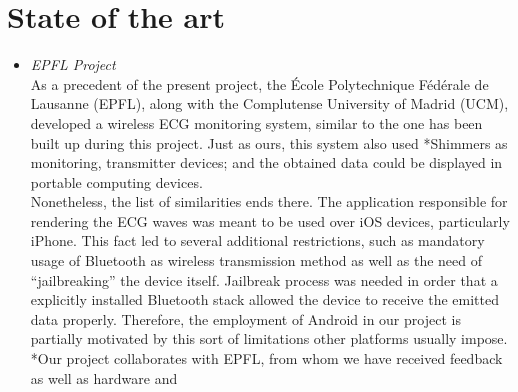 	\section{State of the art}
		\begin{itemize}


			\item \emph{EPFL Project}\\
				As a precedent of the present project, the École Polytechnique Fédérale de Lausanne (EPFL),
				along with the Complutense University of Madrid (UCM), developed a wireless ECG monitoring
				system, similar to the one has been built up during	this project.
				Just as ours, this system also used *Shimmers as monitoring, transmitter devices; %
				and the obtained data could be displayed in portable computing devices.\\
				Nonetheless, the list of similarities ends there. The application responsible for rendering
				the ECG waves was meant to be used over iOS devices, particularly iPhone. This fact led to several
				additional restrictions, such as mandatory usage of Bluetooth as wireless transmission method as
				well as the need of ``jailbreaking'' the device itself. Jailbreak process was needed in order that
				a explicitly installed Bluetooth stack allowed the device to receive the emitted data properly.
				Therefore, the employment of Android in our project is partially motivated by this sort of
				limitations other platforms usually impose.\\
				*Our project collaborates with EPFL, from whom we have received feedback as well as hardware and %

\end{itemize}
